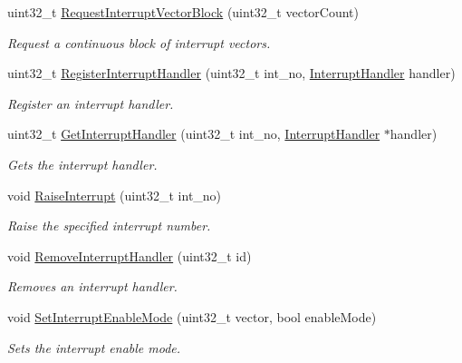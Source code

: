 \begin{DoxyCompactItemize}
\item 
uint32\+\_\+t \hyperlink{group__interrupt__man_ga3cf4616b6e880a89e4bff8ce5f87963c}{Request\+Interrupt\+Vector\+Block} (uint32\+\_\+t vector\+Count)
\begin{DoxyCompactList}\small\item\em Request a continuous block of interrupt vectors. \end{DoxyCompactList}\item 
uint32\+\_\+t \hyperlink{group__interrupt__man_gad3dd8be4c4822d7638fffb07a622e9d3}{Register\+Interrupt\+Handler} (uint32\+\_\+t int\+\_\+no, \hyperlink{group__interrupt__man_ga018c3952c089b6c66a8c04d5626b5d56}{Interrupt\+Handler} handler)
\begin{DoxyCompactList}\small\item\em Register an interrupt handler. \end{DoxyCompactList}\item 
uint32\+\_\+t \hyperlink{group__interrupt__man_ga5c745c8796827bd1097725cb4cc2a6bc}{Get\+Interrupt\+Handler} (uint32\+\_\+t int\+\_\+no, \hyperlink{group__interrupt__man_ga018c3952c089b6c66a8c04d5626b5d56}{Interrupt\+Handler} $\ast$handler)
\begin{DoxyCompactList}\small\item\em Gets the interrupt handler. \end{DoxyCompactList}\item 
void \hyperlink{group__interrupt__man_gaa136d4a1f9b2941b2007490f7892e82f}{Raise\+Interrupt} (uint32\+\_\+t int\+\_\+no)
\begin{DoxyCompactList}\small\item\em Raise the specified interrupt number. \end{DoxyCompactList}\item 
void \hyperlink{group__interrupt__man_ga54064af76219852653d32f909fdaefa1}{Remove\+Interrupt\+Handler} (uint32\+\_\+t id)
\begin{DoxyCompactList}\small\item\em Removes an interrupt handler. \end{DoxyCompactList}\item 
void \hyperlink{group__interrupt__man_gae5f45063340e8fa6b8ff554a7a201575}{Set\+Interrupt\+Enable\+Mode} (uint32\+\_\+t vector, bool enable\+Mode)
\begin{DoxyCompactList}\small\item\em Sets the interrupt enable mode. \end{DoxyCompactList}\item 

\end{DoxyCompactItemize}
